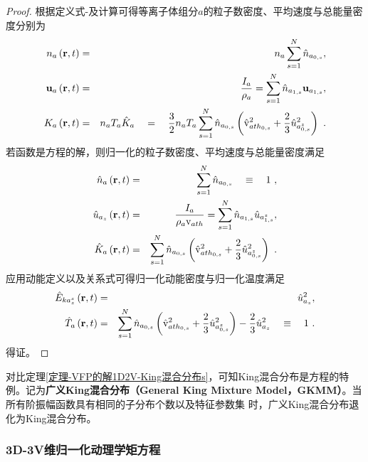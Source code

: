   \begin{proof}
      根据定义式-及计算可得等离子体组分$a$的粒子数密度、平均速度与总能量密度分别为
      \begin{eqnarray}
        n_a \left(\mathbf{r},t \right) &=& n_a \sum_{s=1}^{N} \hat{n}_{a_{0,s}} , \label{naslAxis}
        \\
        \mathbf{u}_a \left(\mathbf{r},t \right) &=& \frac{I_a}{\rho_a} = \sum_{s=1}^{N} \hat{n}_{a_{1,s}} \mathbf{u}_{a_{1,s}} , \label{uaslAxis}
        \\
        K_a \left(\mathbf{r},t \right) &=&  n_a T_a \hat{K}_a \quad = \quad  \frac{3}{2} n_a T_a \sum_{s=1}^{N} \hat{n}_{a_{0,s}} \left(\hat{\mathrm{v}}_{{ath}_{0,s}}^2 + \frac{2}{3} {\hat{u}}_{a_{0,s}^z}^2 \right) ~. \label{KaslAxis}
    \end{eqnarray}
    若函数是方程的解，则归一化的粒子数密度、平均速度与总能量密度满足\begin{eqnarray}
      \hat{n}_a \left(\mathbf{r},t \right) &=& \sum_{s=1}^{N} \hat{n}_{a_{0,s}} \quad \equiv \quad 1 ~, \label{nhaslAxis}
      \\
      {\hat{u}}_{a_z} \left(\mathbf{r},t \right) &=& \frac{I_a}{\rho_a \mathrm{v}_{ath}} = \sum_{s=1}^{N} \hat{n}_{a_{1,s}} {\hat{u}}_{a_{1,s}^z} , \label{uhazslAxis}
      \\
      \hat{K}_a \left(\mathbf{r},t \right) & = &  \sum_{s=1}^{N} \hat{n}_{a_{0,s}} \left(\hat{\mathrm{v}}_{{ath}_{0,s}}^2 + \frac{2}{3} {\hat{u}}_{a_{0,s}^z}^2 \right)  ~. \label{KhaslAxis}
    \end{eqnarray}
    应用动能定义以及关系式可得归一化动能密度与归一化温度满足
    \begin{eqnarray}
      {\hat{E}}_{{ka}_z^s} \left(\mathbf{r},t \right) &=& {\hat{u}}_{a_z}^2, \label{EhkaslAxis}
      \\
      \hat{T}_a \left(\mathbf{r},t \right) &=& \sum_{s=1}^{N} \hat{n}_{a_{0,s}} \left(\hat{\mathrm{v}}_{{ath}_{0,s}}^2 + \frac{2}{3} {\hat{u}}_{a_{0,s}^z}^2 \right) - \frac{2}{3}  {\hat{u}}_{a_z}^2  \quad \equiv \quad 1 ~ . \label{ThaslAxis}
    \end{eqnarray}
    得证。
  \end{proof}
  对比定理\ref{定理-VFP的解1D2V-King混合分布s}，可知King混合分布是方程的特例。记为\textbf{广义King混合分布（General King Mixture Model，GKMM）}。当所有阶振幅函数具有相同的子分布个数以及特征参数集
  时，广义King混合分布退化为King混合分布。
  
  \subsubsection{3D-3V维归一化动理学矩方程}
  \label{3D-3V维归一化动理学矩方程}
  
